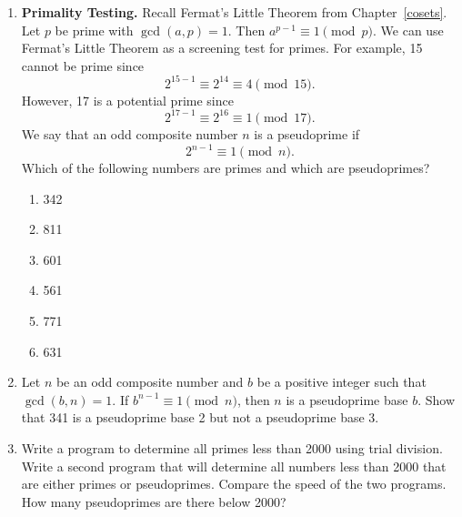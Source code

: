 {\begin{enumerate}
\begin{enumerate}
{}
 
\medskip
 
The expression  $\lceil \sqrt{n}\, \rceil$ means the smallest integer
greater than or equal to the square root of $n$. Write another program
to do factorization using trial division and compare the speed of the
two algorithms. Which algorithm is faster and why?

\end{enumerate}
 
 
\item
{\bf Primality Testing.}
Recall Fermat's Little Theorem from Chapter~\ref{cosets}. Let $p$ be prime with
$\gcd(a, p) = 1$. Then $a^{p-1} \equiv 1 \pmod{p}$.  We can use
Fermat's Little Theorem as a screening test for primes. For example, 15
cannot be prime since
\[
2^{15-1} \equiv 2^{14} \equiv 4 \pmod{15}.
\]
However, 17 is a potential prime since
\[
2^{17-1} \equiv 2^{16} \equiv 1 \pmod{17}.
\]
We say that an odd composite number $n$ is a {\bfi
pseudoprime\/} if 
\[
2^{n-1} \equiv 1 \pmod{n}.
\]
Which of the following numbers are primes  and which are pseudoprimes?
\begin{multicols}{3}
\begin{enumerate}

\item
342

\item
811

\item
601

\item
561

\item
771

\item
631
 
\end{enumerate}
\end{multicols}
 
 

\item
Let $n$ be an odd composite number and $b$ be a positive integer such
that $\gcd(b, n) = 1$. If $b^{n-1} \equiv 1 \pmod{n}$, then $n$ is a
{\bfi pseudoprime base} $b$. Show that 341 is a pseudoprime base 2 but
not a pseudoprime base 3.
 
 
\item
Write a program to determine all primes less than 2000 using
trial division. Write a second program that will determine all numbers
less than 2000 that are either primes or pseudoprimes. Compare the
speed of the two programs.  How many pseudoprimes are there below
2000? 
 

\end{enumerate}}
